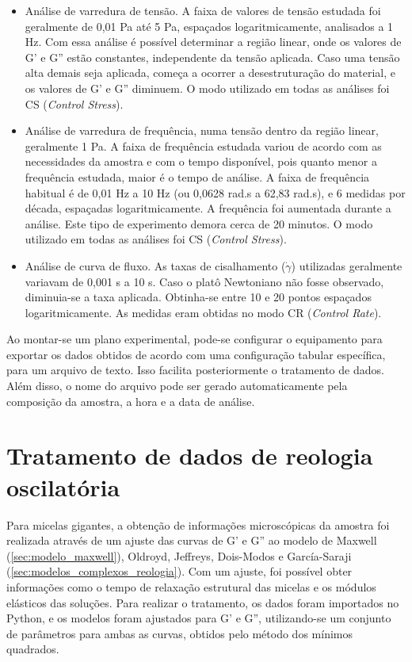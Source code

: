 		\begin{itemize}[noitemsep]
			\item Análise de varredura de tensão. A faixa de valores de tensão estudada foi geralmente de 0,01 Pa até 5 Pa, espaçados logaritmicamente, analisados a 1 Hz. Com essa análise é possível determinar a região linear, onde os valores de G' e G'' estão constantes, independente da tensão aplicada. Caso uma tensão alta demais seja aplicada, começa a ocorrer a desestruturação do material, e os valores de G' e G'' diminuem. O modo utilizado em todas as análises foi CS (\emph{Control Stress}).
			
			\item Análise de varredura de frequência, numa tensão dentro da região linear, geralmente 1 Pa. A faixa de frequência estudada variou de acordo com as necessidades da amostra e com o tempo disponível, pois quanto menor a frequência estudada, maior é o tempo de análise. A faixa de frequência habitual é de 0,01 Hz a 10 Hz (ou 0,0628 rad.s\menosUm{} a 62,83 rad.s\menosUm), e 6 medidas por década, espaçadas logaritmicamente. A frequência foi aumentada durante a análise. Este tipo de experimento demora cerca de 20 minutos. O modo utilizado em todas as análises foi CS (\emph{Control Stress}).
			
			\item Análise de curva de fluxo. As taxas de cisalhamento (\(\dot{\gamma}\)) utilizadas geralmente variavam de 0,001 s\menosUm{} a 10 s\menosUm. Caso o platô Newtoniano não fosse observado, diminuia-se a taxa aplicada. Obtinha-se entre 10 e 20 pontos espaçados logaritmicamente. As medidas eram obtidas no modo CR (\emph{Control Rate}).
		\end{itemize} 
		
		Ao montar-se um plano experimental, pode-se configurar o equipamento para exportar os dados obtidos de acordo com uma configuração tabular específica, para um arquivo de texto. Isso facilita posteriormente o tratamento de dados. Além disso, o nome do arquivo pode ser gerado automaticamente pela composição da amostra, a hora e a data de análise.
		
		\section{Tratamento de dados de reologia oscilatória}
		
		Para micelas gigantes, a obtenção de informações microscópicas da amostra foi realizada através de um ajuste das curvas de G' e G'' ao modelo de Maxwell (\autoref{sec:modelo_maxwell}), Oldroyd, Jeffreys, Dois-Modos e García-Saraji (\autoref{sec:modelos_complexos_reologia}). Com um ajuste, foi possível obter informações como o tempo de relaxação estrutural das micelas e os módulos elásticos das soluções. Para realizar o tratamento, os dados foram importados no Python, e os modelos foram ajustados para G' e G'', utilizando-se um conjunto de parâmetros para ambas as curvas, obtidos pelo método dos mínimos quadrados.
		

